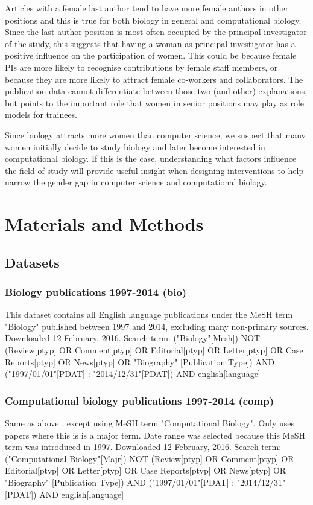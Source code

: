 \documentclass[10pt,letterpaper]{article}
\begin{document}
\begin{flushleft}
Articles with a female last author tend to have more female authors in other positions and this is true for both biology in general and computational biology.  Since the last author position is most often occupied by the principal investigator of the study, this suggests that having a woman as principal investigator has a positive influence on the participation of women. This could be because female PIs are more likely to recognise contributions by female staff members, or because they are more likely to attract female co-workers and collaborators. The publication data cannot differentiate between those two (and other) explanations, but points to the important role that women in senior positions may play as role models for trainees.

Since biology attracts more women than computer science, we suspect that many women initially decide to study biology and later become interested in computational biology. If this is the case, understanding what factors influence the field of study will provide useful insight when designing interventions to help narrow the gender gap in computer science and computational biology.
\section*{Materials and Methods}

\subsection*{Datasets}

\subsubsection*{Biology publications 1997-2014 (bio)}
This dataset \cite{Bonham2016} contains all English language publications under the MeSH term "Biology" published between 1997 and 2014, excluding many non-primary sources. Downloaded 12 February, 2016. Search term: ("Biology"[Mesh]) NOT (Review[ptyp] OR Comment[ptyp] OR Editorial[ptyp] OR Letter[ptyp] OR Case Reports[ptyp] OR News[ptyp] OR "Biography" [Publication Type]) AND ("1997/01/01"[PDAT] : "2014/12/31"[PDAT]) AND english[language]

\subsubsection*{Computational biology publications 1997-2014 (comp)}
Same as above \cite{Bonham2016}, except using MeSH term "Computational Biology". Only uses papers where this is is a major term. Date range was selected because this MeSH term was introduced in 1997. Downloaded 12 February, 2016. Search term: ("Computational Biology"[Majr]) NOT (Review[ptyp] OR Comment[ptyp] OR Editorial[ptyp] OR Letter[ptyp] OR Case Reports[ptyp] OR News[ptyp] OR "Biography" [Publication Type]) AND ("1997/01/01"[PDAT] : "2014/12/31"[PDAT]) AND english[language]


\end{flushleft}
\end{document}
